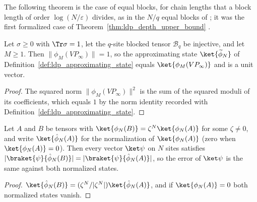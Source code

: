 






The following theorem is the case of equal blocks, for chain lengths that a
block length of order $\log(N/\varepsilon)$ divides, as in the $N/q$ equal
blocks of \cite[eq.~(10)]{Malz2024Preparation}; it was the first formalized
case of Theorem~\ref{thm:ldp_depth_upper_bound}
\cite{gap:mswc24_depth_upper_bound_divisible_length}.

\begin{lemma}
    \label{lem:ldp_approximating_state_unit_norm}
    \leanok
    Let $\sigma\ge0$ with $\Tr\sigma=1$, let the $q$-site blocked tensor
    $\mathcal B_q$ be injective, and let $M\ge1$. Then
    $\lVert\phi_M(VP_\infty)\rVert=1$, so the approximating state
    $\ket{\widetilde\phi_N}$ of Definition~\ref{def:ldp_approximating_state}
    equals $\ket{\phi_M(VP_\infty)}$ and is a unit vector.
\end{lemma}
\begin{proof}
    \leanok
    The squared norm $\lVert\phi_M(VP_\infty)\rVert^2$ is the sum of the
    squared moduli of its coefficients, which equals $1$ by the norm identity
    recorded with Definition~\ref{def:ldp_approximating_state}.
\end{proof}

\begin{lemma}
    \label{lem:ldp_normalized_state_rescaling}
    \leanok
    Let $A$ and $B$ be tensors with $\ket{\phi_N(B)}=\zeta^N\ket{\phi_N(A)}$ for
    some $\zeta\neq0$, and write $\ket{\hat\phi_N(A)}$ for the normalization of
    $\ket{\phi_N(A)}$ (zero when $\ket{\phi_N(A)}=0$). Then every vector
    $\ket\psi$ on $N$ sites satisfies
    $\lvert\braket{\psi}{\hat\phi_N(B)}\rvert=\lvert\braket{\psi}{\hat\phi_N(A)}\rvert$,
    so the error of $\ket\psi$ is the same against both normalized states.
\end{lemma}
\begin{proof}
    \leanok
    $\ket{\hat\phi_N(B)}=(\zeta^N/\lvert\zeta^N\rvert)\ket{\hat\phi_N(A)}$,
    and if $\ket{\phi_N(A)}=0$ both normalized states vanish.
\end{proof}

